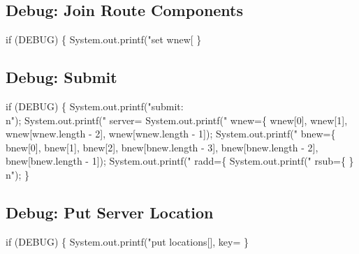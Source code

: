 \subsection{Debug: Join Route Components}

\nwenddocs{}\endmoddef\nwstartdeflinemarkup{}\nwenddeflinemarkup
if (DEBUG) \{
  System.out.printf("set wnew[%
\}
\nwendcode{}\nwdocspar

\subsection{Debug: Submit}

\nwenddocs{}\endmoddef\nwstartdeflinemarkup{}\nwenddeflinemarkup
if (DEBUG) \{
  System.out.printf("submit:\\n");
  System.out.printf("  server=%
  System.out.printf("  wnew=\{ %
      wnew[0], wnew[1], wnew[wnew.length - 2], wnew[wnew.length - 1]);
  System.out.printf("  bnew=\{ %
      bnew[0], bnew[1], bnew[2],
      bnew[bnew.length - 3], bnew[bnew.length - 2], bnew[bnew.length - 1]);
  System.out.printf("  radd=\{ %
  System.out.printf("  rsub=\{ \}\\n");
\}
\nwendcode{}\nwdocspar

\subsection{Debug: Put Server Location}

\nwenddocs{}\endmoddef\nwstartdeflinemarkup{}\nwenddeflinemarkup
if (DEBUG) \{
  System.out.printf("put locations[], key=%
\}
\nwendcode{}\nwdocspar

